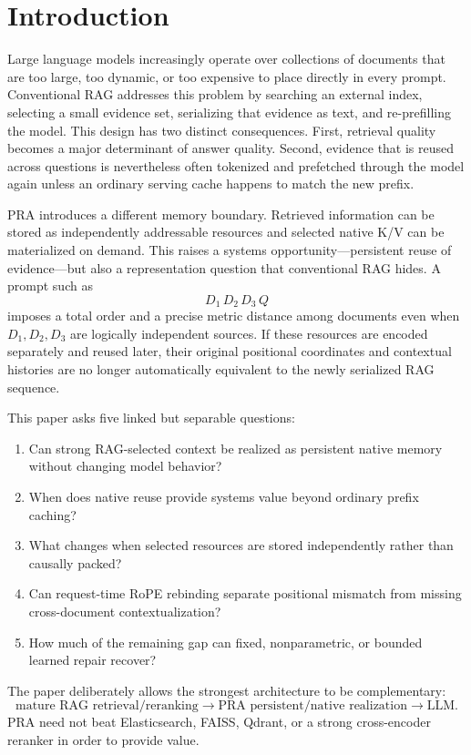 \documentclass[11pt]{article}
\begin{document}
\section{Introduction}

Large language models increasingly operate over collections of documents that are too large, too dynamic, or too expensive to place directly in every prompt.  Conventional RAG addresses this problem by searching an external index, selecting a small evidence set, serializing that evidence as text, and re-prefilling the model.  This design has two distinct consequences.  First, retrieval quality becomes a major determinant of answer quality.  Second, evidence that is reused across questions is nevertheless often tokenized and prefetched through the model again unless an ordinary serving cache happens to match the new prefix.

PRA introduces a different memory boundary.  Retrieved information can be stored as independently addressable resources and selected native K/V can be materialized on demand.  This raises a systems opportunity---persistent reuse of evidence---but also a representation question that conventional RAG hides.  A prompt such as
\[
D_1\,D_2\,D_3\,Q
\]
imposes a total order and a precise metric distance among documents even when $D_1,D_2,D_3$ are logically independent sources.  If these resources are encoded separately and reused later, their original positional coordinates and contextual histories are no longer automatically equivalent to the newly serialized RAG sequence.

This paper asks five linked but separable questions:
\begin{enumerate}[leftmargin=*]
    \item Can strong RAG-selected context be realized as persistent native
    memory without changing model behavior?
    \item When does native reuse provide systems value beyond ordinary prefix
    caching?
    \item What changes when selected resources are stored independently rather
    than causally packed?
    \item Can request-time RoPE rebinding separate positional mismatch from
    missing cross-document contextualization?
    \item How much of the remaining gap can fixed, nonparametric, or bounded
    learned repair recover?
\end{enumerate}

The paper deliberately allows the strongest architecture to be complementary:
\[
\text{mature RAG retrieval/reranking}
\rightarrow
\text{PRA persistent/native realization}
\rightarrow
\text{LLM}.
\]
PRA need not beat Elasticsearch, FAISS, Qdrant, or a strong cross-encoder reranker in order to provide value.
\end{document}
